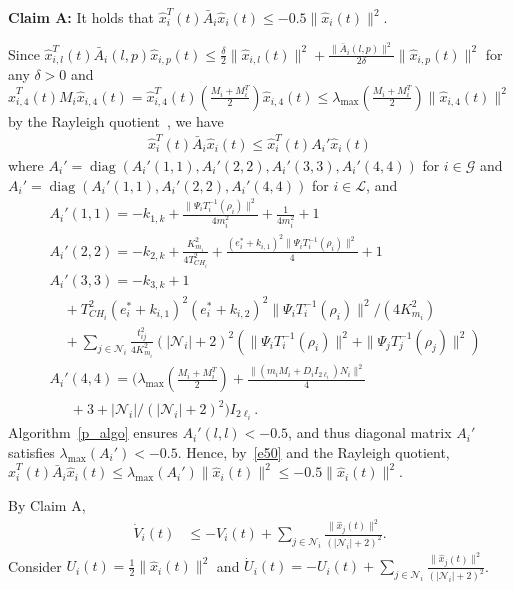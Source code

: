 \documentclass[journal]{IEEEtran}
\newcommand{\lbd}{{\lambda}}
\newcommand{\nnum}{\nonumber}
\newcommand{\GG}{{\mathcal{G}}}
\newcommand{\LL}{{\mathcal{L}}}
\newcommand{\NN}{{\mathcal{N}}}
\newcommand{\diag}[1]{\operatorname{diag}(#1)}
\begin{document}
\textbf{Claim A:} It holds that $\hat{x}_i^T(t)\bar{A}_i\hat{x}_i(t) \leq -0.5\|\hat{x}_i(t)\|^2$.
\begin{IEEEproof}
Since $\hat{x}_{i,l}^T(t)\bar{A}_i(l,p)\hat{x}_{i,p}(t) \leq \frac{\delta}{2} \|\hat{x}_{i,l}(t)\|^2 + \frac{\|\bar{A}_i(l,p)\|^2}{2\delta}\|\hat{x}_{i,p}(t)\|^2$ for any $\delta>0$ and $\hat{x}_{i,4}^T(t)M_i \hat{x}_{i,4}(t) = \hat{x}_{i,4}^T(t)(\frac{M_i+M_i^T}{2}) \hat{x}_{i,4}(t)\leq \lbd_{\max}(\frac{M_i+M_i^T}{2})\|\hat{x}_{i,4}(t)\|^2$ by the Rayleigh quotient~\cite{parlett1974rayleigh}, we have
\begin{align}
\hat{x}_{i}^T(t) \bar{A}_i \hat{x}_{i}(t) \leq \hat{x}_{i}^T(t) A_i' \hat{x}_{i}(t) 
\label{e50}
\end{align}
where $A_i' = \diag{A_i'(1,1),A_i'(2,2),A_i'(3,3),A_i'(4,4)}$ for $i \in {\GG}$ and $A_i' = \diag{A_i'(1,1),A_i'(2,2),A_i'(4,4)}$ for $i \in {\LL}$, and
\begin{align*}
&A_i'(1,1)=-k_{1,k} + \frac{\|\Psi_iT_i^{-1}(\rho_i)\|^2}{4 m_i^2}+\frac{1}{4m_i^2}+1\nnum\\
&A_i'(2,2)=-k_{2,k} + \frac{K_{m_i}^2}{4T_{CH_i}^2}+\frac{(e_i^*+k_{i,1})^2\|\Psi_iT_i^{-1}(\rho_i)\|^2}{4} +1\nnum\\
&A_i'(3,3)=-k_{3,k}+1\nnum\\
&\quad +  T_{CH_i}^2(e_i^*+k_{i,1})^2(e^*_i+k_{i,2})^2\|\Psi_iT_i^{-1}(\rho_i)\|^2/(4K_{m_i}^2)\nnum\\
&\quad +\sum_{j \in {{\NN}}_i}\frac{t_{ij}^2}{4K_{m_i}^2}(|{{\NN}}_i|+2)^2(\|\Psi_iT_i^{-1}(\rho_i)\|^2+\|\Psi_jT_j^{-1}(\rho_j)\|^2)\nnum\\
&A_i'(4,4)=(\lbd_{\max}(\frac{M_i+M_i^T}{2}) + \frac{\|(m_iM_i+ D_i I_{2\ell_i})N_i\|^2}{4}\nnum\\
&\quad \ \ +3+|{{\NN}}_i|/(|{{\NN}}_i|+2)^2)I_{2\ell_i}.
\end{align*}
Algorithm~\ref{p_algo} ensures $A_i'(l,l)<-0.5$, and thus diagonal matrix $A_i'$ satisfies $\lbd_{\max}(A_i')<-0.5$. Hence, by~\eqref{e50} and the Rayleigh quotient, $\hat{x}_{i}^T(t) \bar{A}_i \hat{x}_{i}(t) \leq \lbd_{\max}( A_i')\|\hat{x}_{i}(t)\|^2 \leq -0.5\|\hat{x}_{i}(t)\|^2$.
\end{IEEEproof}
By Claim A,
\begin{align*}
\dot{V}_{i}(t) &\leq -V_i(t)+ \sum_{j \in {{\NN}}_i} \frac{\|\hat{x}_j(t)\|^2}{(|{{\NN}}_i|+2)^2}.
\end{align*}
Consider $U_i(t) =\frac{1}{2}\|\hat{x}_{i}(t)\|^2$ and $\dot{U}_i(t)=-U_i(t)+ \sum_{j \in {{\NN}}_i} \frac{\|\hat{x}_j(t)\|^2}{(|{{\NN}}_i|+2)^2}$.
\end{document}
